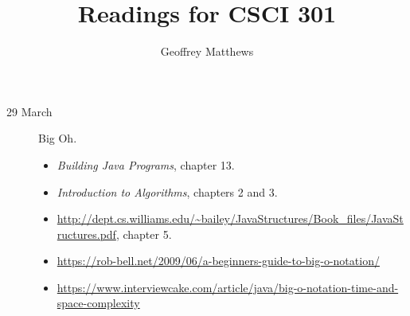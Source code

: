 \documentclass{article}
\title{Readings for CSCI 301}
\author{Geoffrey Matthews}
\begin{document}
\maketitle
\begin{description}
\item[29 March]  Big Oh.
  
  \begin{itemize}
    \item {\em Building Java Programs}, chapter 13.
    \item {\em Introduction to Algorithms}, chapters 2 and 3.
      \item \url{http://dept.cs.williams.edu/~bailey/JavaStructures/Book_files/JavaStructures.pdf}, chapter 5.
  \item \url{https://rob-bell.net/2009/06/a-beginners-guide-to-big-o-notation/}
    \item \url{https://www.interviewcake.com/article/java/big-o-notation-time-and-space-complexity}
  \end{itemize}
\end{description}
\end{document}
